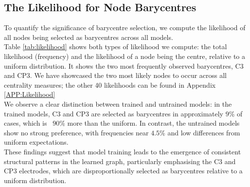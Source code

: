 \subsection{The Likelihood for Node Barycentres}
To quantify the significance of barycentre selection, we compute the likelihood of all nodes being selected as barycentres across all models.
\vspace{0.5em}\\
Table \ref{tab:likelihood} shows both types of likelihood we compute: the total likelihood (frequency) and the likelihood of a node being the centre, relative to a uniform distribution. It shows the two most frequently observed barycentres, C3 and CP3. We have showcased the two most likely nodes to occur across all centrality measures; the other 40 likelihoods can be found in  Appendix \ref{APP:Likelihood}
\vspace{0.5em}\\
We observe a clear distinction between trained and untrained models: in the trained models, C3 and CP3 are selected as barycentres in approximately $9$\% of cases, which is ~$90$\% more than the uniform.
In contrast, the untrained models show no strong preference, with frequencies near $4.5$\% and low differences from uniform expectations.
\vspace{0.5em}\\
These findings suggest that model training leads to the emergence of consistent structural patterns in the learned graph, particularly emphasising the C3 and CP3 electrodes, which are disproportionally selected as barycentres relative to a uniform distribution.
